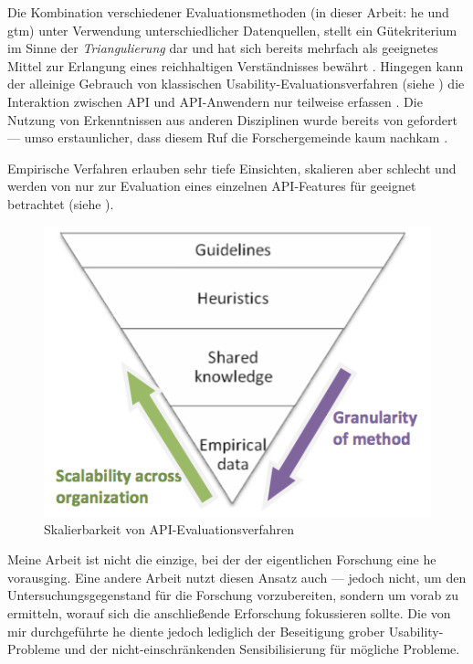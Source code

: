 Die Kombination verschiedener Evaluationsmethoden (in dieser Arbeit: \gls{he} und \gls{gtm}) unter Verwendung unterschiedlicher Datenquellen, stellt ein Gütekriterium im Sinne der \textit{Triangulierung} \citep[siehe  und][]{mayring2002einfhrung} dar und hat sich bereits mehrfach als geeignetes Mittel zur Erlangung eines reichhaltigen Verständnisses bewährt \citep{Boehm:2003tc,Grill:2012jm}. Hingegen kann der alleinige Gebrauch von klassischen Usability-Evaluationsverfahren (siehe ) die Interaktion zwischen API und API-Anwendern nur teilweise erfassen \citep{Tenny:2011jp}. Die Nutzung von Erkenntnissen aus anderen Disziplinen wurde bereits von \cite{BenShneiderman:gn} gefordert --- umso erstaunlicher, dass diesem Ruf die Forschergemeinde kaum nachkam \citep{Glass:2002ec}.

Empirische Verfahren erlauben sehr tiefe Einsichten, skalieren aber schlecht und werden von \cite{SIGCHI:2009up} nur zur Evaluation eines einzelnen API-Features für geeignet betrachtet (siehe ).

\begin{figure}
  \centering
    \includegraphics[width=0.5\linewidth]{Figures/api-usability-granularitaet.png}
  \caption{Skalierbarkeit von API-Evaluationsverfahren \citep{SIGCHI:2009up}}
  \label{fig:api-usability-granularitaet}
\end{figure}

Meine Arbeit ist nicht die einzige, bei der der eigentlichen Forschung eine \gls{he} vorausging. Eine andere Arbeit \citep[siehe  und ][]{Grill:2012jm} nutzt diesen Ansatz auch --- jedoch nicht, um den Untersuchungsgegenstand für die Forschung vorzubereiten, sondern um vorab zu ermitteln, worauf sich die anschließende Erforschung fokussieren sollte. Die von mir durchgeführte \gls{he} diente jedoch lediglich der Beseitigung grober Usability-Probleme und der nicht-einschränkenden Sensibilisierung für mögliche Probleme.

